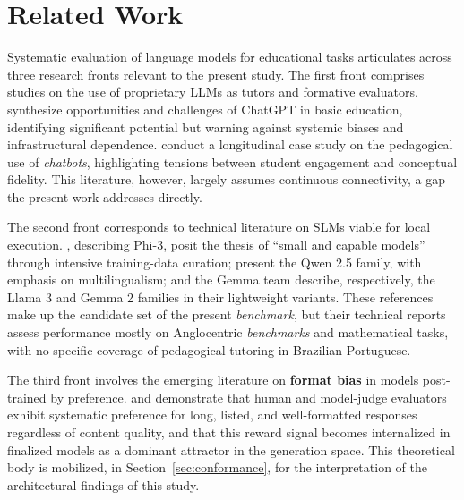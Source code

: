 \documentclass{sbc2023}%
\begin{document}
\section{Related Work}
\label{sec:related}

Systematic evaluation of language models for educational tasks articulates across three research fronts relevant to the present study. The first front comprises studies on the use of proprietary LLMs as tutors and formative evaluators. \citet{kasneci2023chatgpt} synthesize opportunities and challenges of ChatGPT in basic education, identifying significant potential but warning against systemic biases and infrastructural dependence. \citet{tlili2023devil} conduct a longitudinal case study on the pedagogical use of \textit{chatbots}, highlighting tensions between student engagement and conceptual fidelity. This literature, however, largely assumes continuous connectivity, a gap the present work addresses directly.

The second front corresponds to technical literature on SLMs viable for local execution. \citet{abdin2024phi3}, describing Phi-3, posit the thesis of ``small and capable models'' through intensive training-data curation; \citet{yang2024qwen25} present the Qwen 2.5 family, with emphasis on multilingualism; \citet{grattafiori2024llama3} and the Gemma team \citep{gemma2024} describe, respectively, the Llama 3 and Gemma 2 families in their lightweight variants. These references make up the candidate set of the present \textit{benchmark}, but their technical reports assess performance mostly on Anglocentric \textit{benchmarks} and mathematical tasks, with no specific coverage of pedagogical tutoring in Brazilian Portuguese.

The third front involves the emerging literature on \textbf{format bias} in models post-trained by preference. \citet{zheng2023judging} and \citet{wu2023style} demonstrate that human and model-judge evaluators exhibit systematic preference for long, listed, and well-formatted responses regardless of content quality, and that this reward signal becomes internalized in finalized models as a dominant attractor in the generation space. This theoretical body is mobilized, in Section~\ref{sec:conformance}, for the interpretation of the architectural findings of this study.
\end{document}

